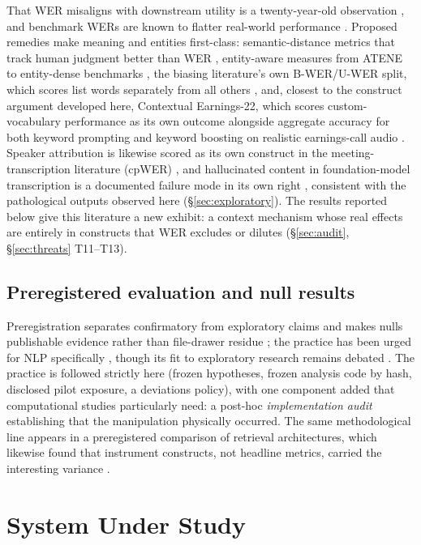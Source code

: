 \documentclass[11pt]{article}
\begin{document}
That WER misaligns with downstream utility is a twenty-year-old observation \citep{wang03,favre13}, and benchmark WERs are known to flatter real-world performance \citep{szymanski20}. Proposed remedies make meaning and entities first-class: semantic-distance metrics that track human judgment better than WER \citep{kim21,kim22}, entity-aware measures from ATENE \citep{benjannet15} to entity-dense benchmarks \citep{delrio21}, the biasing literature's own B-WER/U-WER split, which scores list words separately from all others \citep{le21}, and, closest to the construct argument developed here, Contextual Earnings-22, which scores custom-vocabulary performance as its own outcome alongside aggregate accuracy for both keyword prompting and keyword boosting on realistic earnings-call audio \citep{durmus26}. Speaker attribution is likewise scored as its own construct in the meeting-transcription literature (cpWER) \citep{watanabe20}, and hallucinated content in foundation-model transcription is a documented failure mode in its own right \citep{koenecke24}, consistent with the pathological outputs observed here (\S\ref{sec:exploratory}). The results reported below give this literature a new exhibit: a context mechanism whose real effects are entirely in constructs that WER excludes or dilutes (\S\ref{sec:audit}, \S\ref{sec:threats} T11--T13).

\subsection{Preregistered evaluation and null results}

Preregistration separates confirmatory from exploratory claims and makes nulls publishable evidence rather than file-drawer residue \citep{nosek18}; the practice has been urged for NLP specifically \citep{vanmiltenburg21}, though its fit to exploratory research remains debated \citep{sogaard23}. The practice is followed strictly here (frozen hypotheses, frozen analysis code by hash, disclosed pilot exposure, a deviations policy), with one component added that computational studies particularly need: a post-hoc \emph{implementation audit} establishing that the manipulation physically occurred. The same methodological line appears in a preregistered comparison of retrieval architectures, which likewise found that instrument constructs, not headline metrics, carried the interesting variance \citep{cochran26}.

\section{System Under Study}
\label{sec:system}
\end{document}
